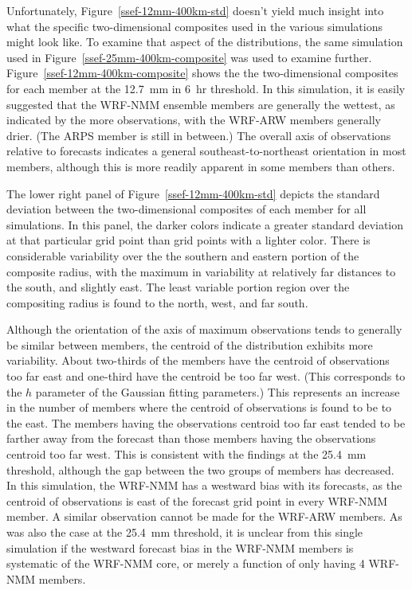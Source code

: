 Unfortunately, \mbox{Figure \ref{ssef-12mm-400km-std}} doesn't yield much insight into what the specific two-dimensional composites used in the various simulations might look like.
To examine that aspect of the distributions, the same simulation used in \mbox{Figure \ref{ssef-25mm-400km-composite}} was used to examine further.
\mbox{Figure \ref{ssef-12mm-400km-composite}} shows the the two-dimensional composites for each member at the \mbox{12.7 mm} in \mbox{6 hr} threshold.
In this simulation, it is easily suggested that the WRF-NMM ensemble members are generally the wettest, as indicated by the more observations, with the WRF-ARW members generally drier.
(The ARPS member is still in between.)
The overall axis of observations relative to forecasts indicates a general southeast-to-northeast orientation in most members, although this is more readily apparent in some members than others.


The lower right panel of \mbox{Figure \ref{ssef-12mm-400km-std}} depicts the standard deviation between the two-dimensional composites of each member for all simulations.
In this panel, the darker colors indicate a greater standard deviation at that particular grid point than grid points with a lighter color.
There is considerable variability over the the southern and eastern portion of the composite radius, with the maximum in variability at relatively far distances to the south, and slightly east.
The least variable portion region over the compositing radius is found to the north, west, and far south.


Although the orientation of the axis of maximum observations tends to generally be similar between members, the centroid of the distribution exhibits more variability.
About two-thirds of the members have the centroid of observations too far east and one-third have the centroid be too far west.
(This corresponds to the $h$ parameter of the Gaussian fitting parameters.)
This represents an increase in the number of members where the centroid of observations is found to be to the east.
The members having the observations centroid too far east tended to be farther away from the forecast than those members having the observations centroid too far west.
This is consistent with the findings at the \mbox{25.4 mm} threshold, although the gap between the two groups of members has decreased.
In this simulation, the WRF-NMM has a westward bias with its forecasts, as the centroid of observations is east of the forecast grid point in every WRF-NMM member.
A similar observation cannot be made for the WRF-ARW members.
As was also the case at the \mbox{25.4 mm} threshold, it is unclear from this single simulation if the westward forecast bias in the WRF-NMM members is systematic of the WRF-NMM core, or merely a function of only having 4 WRF-NMM members.



